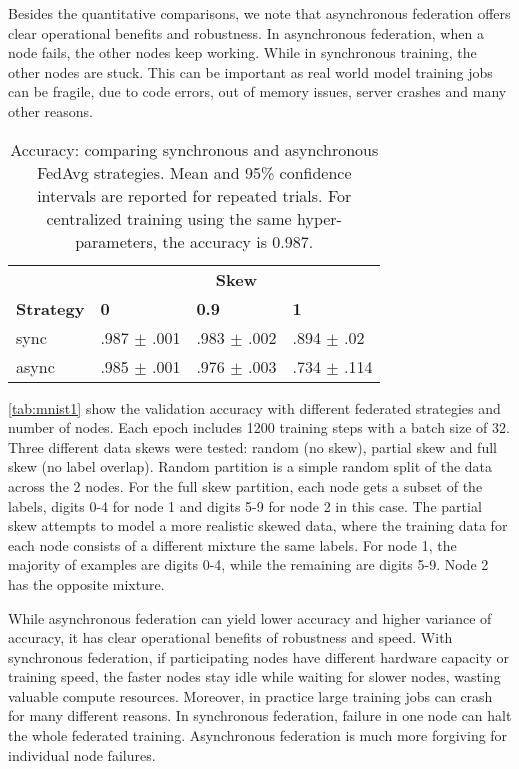 \documentclass[twocolumn, switch]{article} %
\begin{document}
Besides the quantitative comparisons, we note that asynchronous federation offers clear operational benefits and robustness. In asynchronous federation, when a node fails, the other nodes keep working. While in synchronous training, the other nodes are stuck. This can be important as real world model training jobs can be fragile, due to code errors, out of memory issues, server crashes and many other reasons.

\begin{table}[H]
\begin{center}
\begin{tabular}{l|lll}
\toprule
    & \multicolumn{3}{c}{\textbf{Skew}} \\
    \textbf{Strategy} & \textbf{0} & \textbf{0.9} & \textbf{1}  \\
    \midrule
    
    sync & .987 $\pm$ .001 & .983 $\pm$ .002 & .894 $\pm$ .02 \\
    async & .985 $\pm$ .001 & .976 $\pm$ .003 & .734 $\pm$ .114 \\
    
    \bottomrule
   \end{tabular}
   \vspace{5pt}
\caption{Accuracy: comparing synchronous and asynchronous FedAvg strategies. Mean and 95\% confidence intervals are reported for repeated trials. For centralized training using the same hyper-parameters, the accuracy is 0.987.}
\label{tab:mnist1}
\end{center}
\end{table}

\autoref{tab:mnist1} show the validation accuracy with different federated strategies and number of nodes. Each epoch includes 1200 training steps with a batch size of 32. Three different data skews were tested: random (no skew), partial skew and full skew (no label overlap). Random partition is a simple random split of the data across the 2 nodes. For the full skew partition, each node gets a subset of the labels, digits 0-4 for node 1 and digits 5-9 for node 2 in this case. The partial skew attempts to model a more realistic skewed data, where the training data for each node consists of a different mixture the same labels. For node 1, the majority of examples are digits 0-4, while the remaining are digits 5-9. Node 2 has the opposite mixture.

While asynchronous federation can yield lower accuracy and higher variance of accuracy, it has clear operational benefits of robustness and speed. With synchronous federation, if participating nodes have different hardware capacity or training speed, the faster nodes stay idle while waiting for slower nodes, wasting valuable compute resources. Moreover, in practice large training jobs can crash for many different reasons. In synchronous federation, failure in one node can halt the whole federated training. Asynchronous federation is much more forgiving for individual node failures. 
\end{document}
